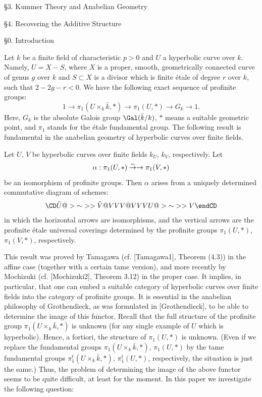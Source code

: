 \subhead
\S 3. Kummer Theory and Anabelian Geometry
\endsubhead

\subhead	
\S 4. Recovering the Additive Structure
\endsubhead

\endtoc

\endtopmatter

\document            

\subhead
\S 0. Introduction
\endsubhead

Let $k$ be a finite field of characteristic $p>0$ and 
$U$ a hyperbolic curve over $k$. Namely, $U=X-S$, where 
$X$ is a proper, smooth, geometrically connected curve 
of genus $g$ over $k$ and $S\subset X$ is a divisor 
which is finite \'etale of degree $r$ over $k$, such that 
$2-2g-r<0$. 
We have the following exact sequence of profinite groups:
$$1\to \pi_1(U\times _k{\bar k},*)\to \pi_1(U,*)\to G_k\to 1.$$
Here, $G_k$ is the absolute Galois group $\Gal (\bar k/k)$, $*$ 
means a suitable geometric 
point, and $\pi _1$ stands for the \'etale fundamental group. 
The following result is fundamental
in the anabelian geometry of hyperbolic curves over finite fields.

 Let $U$, $V$ be 
hyperbolic curves over 
finite fields $k_U$, $k_V$, respectively. Let 
$$\alpha : \pi_1(U,*)\overset \sim \to \rightarrow \pi_1(V,*)$$
be an isomorphism of profinite groups. 
Then $\alpha$ arises from a uniquely determined 
commutative diagram of schemes:
$$
\CD
\Tilde U@>{\sim}>> \Tilde V\\
@VVV   @VVV \\
U @>{\sim}>> V\\
\endCD
$$
in which the horizontal arrows are isomorphisms, and the vertical arrows are the 
profinite \'etale universal coverings determined 
by the profinite groups $\pi_1(U,*)$, $\pi_1(V,*)$, respectively.
\endproclaim

This result was proved by Tamagawa (cf. [Tamagawa1], Theorem (4.3)) in the affine case 
(together with a certain tame version), 
and more recently by Mochizuki (cf. [Mochizuki2], Theorem 3.12) in the proper case. 
It implies, in particular, that one can embed a suitable category of hyperbolic 
curves over finite fields into the category of profinite groups. It is essential in 
the anabelian philosophy of Grothendieck, as was formulated in [Grothendieck], 
to be able to determine the image of this functor. Recall that the full structure 
of the profinite group $\pi_1(U\times _k{\bar k},*)$ is unknown 
(for any single example of 
$U$ which is hyperbolic). Hence, a fortiori, the structure of  
$\pi_1(U,*)$ is unknown. 
(Even if we replace the fundamental groups 
$\pi_1(U\times _k{\bar k},*)$, $\pi_1(U,*)$ by the tame fundamental groups 
$\pi_1^t(U\times _k{\bar k},*)$, $\pi_1^t(U,\ast)$, respectively, 
the situation is just the same.) 
Thus, the problem of determining the image of the above functor 
seems to be quite difficult, at least for the moment. 
In this paper we investigate the following question:

